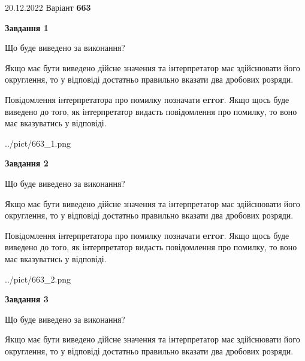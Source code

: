 \documentclass[12pt, ukrainian]{article}
\begin{document}
{20.12.2022 Варіант \No \textbf { 663 }\par}
{
\begin {Large}

{\begin {center}\textbf{Завдання 1}\end {center}}\par
Що буде виведено за виконання? \par

Якщо має бути виведено дійсне значення та інтерпретатор має здійснювати його округлення, 
то у відповіді достатньо правильно вказати два дробових розряди.

Повідомлення інтерпретатора про помилку позначати \textbf{error}.
Якщо щось буде виведено до того, як інтерпретатор видасть повідомлення про помилку, 
то воно має вказуватись у відповіді. \par

\begin{center}
	{../pict/663_1.png}
\end{center}
\newpage

{\begin {center}\textbf{Завдання 2}\end {center}}\par
Що буде виведено за виконання? \par

Якщо має бути виведено дійсне значення та інтерпретатор має здійснювати його округлення, 
то у відповіді достатньо правильно вказати два дробових розряди.

Повідомлення інтерпретатора про помилку позначати \textbf{error}.
Якщо щось буде виведено до того, як інтерпретатор видасть повідомлення про помилку, 
то воно має вказуватись у відповіді. \par

\begin{center}
	{../pict/663_2.png}
\end{center}
\newpage

{\begin {center}\textbf{Завдання 3}\end {center}}\par
Що буде виведено за виконання? \par

Якщо має бути виведено дійсне значення та інтерпретатор має здійснювати його округлення, 
то у відповіді достатньо правильно вказати два дробових розряди.


\end{Large}}
\end{document}
